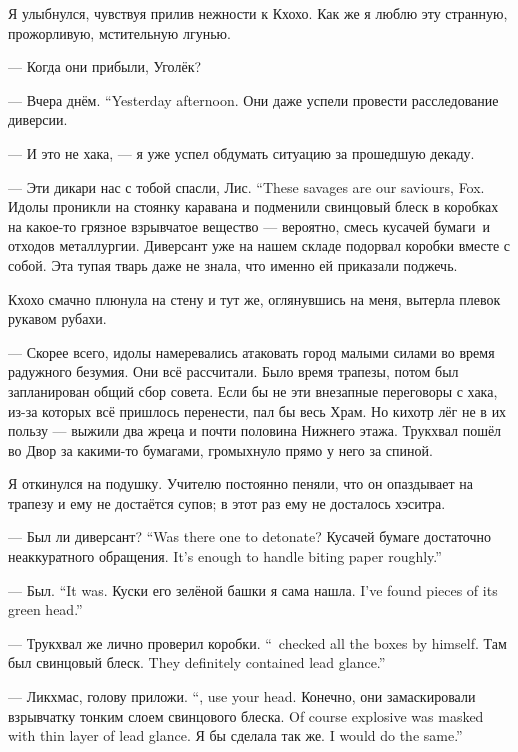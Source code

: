 Я улыбнулся, чувствуя прилив нежности к Кхохо.
Как же я люблю эту странную, прожорливую, мстительную лгунью.

--- Когда они прибыли, Уголёк?

{--- Вчера днём.}
{``Yesterday afternoon.}
Они даже успели провести расследование диверсии.

--- И это не хака, --- я уже успел обдумать ситуацию за прошедшую декаду.

{--- Эти дикари нас с тобой спасли, Лис.}
{``These savages are our saviours, Fox.}
Идолы проникли на стоянку каравана и подменили свинцовый блеск в коробках на какое-то грязное взрывчатое вещество --- вероятно, смесь кусачей бумаги\FM\ и отходов металлургии.
Диверсант уже на нашем складе подорвал коробки вместе с собой.
Эта тупая тварь даже не знала, что именно ей приказали поджечь.

Кхохо смачно плюнула на стену и тут же, оглянувшись на меня, вытерла плевок рукавом рубахи.

--- Скорее всего, идолы намеревались атаковать город малыми силами во время радужного безумия.
Они всё рассчитали.
Было время трапезы, потом был запланирован общий сбор совета.
Если бы не эти внезапные переговоры с хака, из-за которых всё пришлось перенести, пал бы весь Храм.
Но кихотр лёг не в их пользу --- выжили два жреца и почти половина Нижнего этажа.
Трукхвал пошёл во Двор за какими-то бумагами, громыхнуло прямо у него за спиной.

Я откинулся на подушку.
Учителю постоянно пеняли, что он опаздывает на трапезу и ему не достаётся супов;
в этот раз ему не досталось хэситра.

{--- Был ли диверсант?}
{``Was there one to detonate?}
{Кусачей бумаге достаточно неаккуратного обращения.}
{It's enough to handle biting paper roughly.''}

{--- Был.}
{``It was.}
{Куски его зелёной башки я сама нашла.}
{I've found pieces of its green head.''}

{--- Трукхвал же лично проверил коробки.}
{``\Trukchual\ checked all the boxes by himself.}
{Там был свинцовый блеск.}
{They definitely contained lead glance.''}

{--- Ликхмас, голову приложи.}
{``\Likchmas, use your head.}
{Конечно, они замаскировали взрывчатку тонким слоем свинцового блеска.}
{Of course explosive was masked with thin layer of lead glance.}
{Я бы сделала так же.}
{I would do the same.''}

